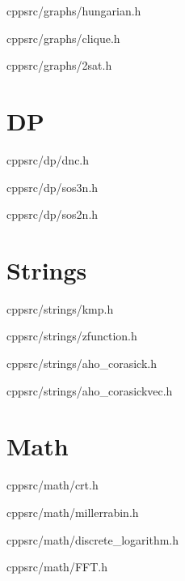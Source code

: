 \documentclass[portrait, 8pt, a4paper, oneside, twocolumn]{extarticle}
\begin{document}
    {}
    {}
    {cpp}{src/graphs/hungarian.h}
    \noindent\hrulefill

    {}
    {}
    {cpp}{src/graphs/clique.h}
    \noindent\hrulefill

    {}
    {}
    {cpp}{src/graphs/2sat.h}
    \noindent\hrulefill

\section{DP}
    {}
    {}
    {cpp}{src/dp/dnc.h}
    \noindent\hrulefill
	
	{}
	{}
	{cpp}{src/dp/sos3n.h}
	\noindent\hrulefill

	{}
	{}
	{cpp}{src/dp/sos2n.h}
	\noindent\hrulefill

\section{Strings}
	
    {}
    {}
    {cpp}{src/strings/kmp.h}
    \noindent\hrulefill

    {}
    {}
    {cpp}{src/strings/zfunction.h}
    \noindent\hrulefill

    {}
    {}
    {cpp}{src/strings/aho_corasick.h}
    \noindent\hrulefill

    {}
    {}
    {cpp}{src/strings/aho_corasickvec.h}
    \noindent\hrulefill

    
\section{Math}

    {}
    {}
    {cpp}{src/math/crt.h}
    \noindent\hrulefill

    {}
    {}
    {cpp}{src/math/millerrabin.h}
    \noindent\hrulefill

    {}
    {}
    {cpp}{src/math/discrete_logarithm.h}
    \noindent\hrulefill

    {}
    {}
    {cpp}{src/math/FFT.h}
    \noindent\hrulefill
    
\end{document}
